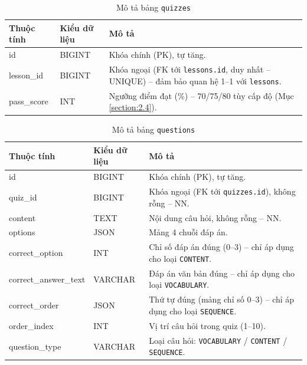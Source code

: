 \documentclass[../DoAn.tex]{subfiles}
\begin{document}
\begin{table}[H]
\centering
\small
\renewcommand{\arraystretch}{1.2}
\begin{tabular}{|p{3.2cm}|p{2.4cm}|p{8cm}|}
\hline
\textbf{Thuộc tính} & \textbf{Kiểu dữ liệu} & \textbf{Mô tả} \\ \hline
id & BIGINT & Khóa chính (PK), tự tăng. \\ \hline
lesson\_id & BIGINT & Khóa ngoại (FK tới \texttt{lessons.id}, duy nhất -- UNIQUE) -- đảm bảo quan hệ 1--1 với \texttt{lessons}. \\ \hline
pass\_score & INT & Ngưỡng điểm đạt (\%) -- 70/75/80 tùy cấp độ (Mục \ref{section:2.4}). \\ \hline
\end{tabular}
\renewcommand{\arraystretch}{1}
\caption{Mô tả bảng \texttt{quizzes}}
\label{table:db-quizzes}
\end{table}

\begin{table}[H]
\centering
\small
\renewcommand{\arraystretch}{1.2}
\begin{tabular}{|p{3.2cm}|p{2.4cm}|p{8cm}|}
\hline
\textbf{Thuộc tính} & \textbf{Kiểu dữ liệu} & \textbf{Mô tả} \\ \hline
id & BIGINT & Khóa chính (PK), tự tăng. \\ \hline
quiz\_id & BIGINT & Khóa ngoại (FK tới \texttt{quizzes.id}), không rỗng -- NN. \\ \hline
content & TEXT & Nội dung câu hỏi, không rỗng -- NN. \\ \hline
options & JSON & Mảng 4 chuỗi đáp án. \\ \hline
correct\_option & INT & Chỉ số đáp án đúng (0--3) -- chỉ áp dụng cho loại \texttt{CONTENT}. \\ \hline
correct\_answer\_text & VARCHAR & Đáp án văn bản đúng -- chỉ áp dụng cho loại \texttt{VOCABULARY}. \\ \hline
correct\_order & JSON & Thứ tự đúng (mảng chỉ số 0--3) -- chỉ áp dụng cho loại \texttt{SEQUENCE}. \\ \hline
order\_index & INT & Vị trí câu hỏi trong quiz (1--10). \\ \hline
question\_type & VARCHAR & Loại câu hỏi: \texttt{VOCABULARY} / \texttt{CONTENT} / \texttt{SEQUENCE}. \\ \hline
\end{tabular}
\renewcommand{\arraystretch}{1}
\caption{Mô tả bảng \texttt{questions}}
\label{table:db-questions}
\end{table}
\end{document}
